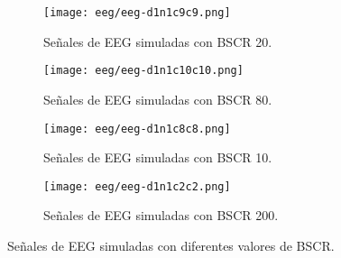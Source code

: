 
\begin{sidewaysfigure}[p]
    \centering
    \begin{subfigure}[b]{0.45\textwidth}
        \texttt{[image: eeg/eeg-d1n1c9c9.png]}
        \caption{Señales de EEG simuladas con BSCR 20.}
        \label{fig:eeg-d1n1c9c9}
        \vspace{1em}
    \end{subfigure}
    \hfill
    \begin{subfigure}[b]{0.45\textwidth}
        \texttt{[image: eeg/eeg-d1n1c10c10.png]}
        \caption{Señales de EEG simuladas con BSCR 80.}
        \label{fig:eeg-d1n1c10c10}
        \vspace{1em}
    \end{subfigure}
    \vfill
    \begin{subfigure}[b]{0.45\textwidth}
        \texttt{[image: eeg/eeg-d1n1c8c8.png]}
        \caption{Señales de EEG simuladas con BSCR 10.}
        \label{fig:eeg-d1n1c8c8}
    \end{subfigure}
    \hfill
    \begin{subfigure}[b]{0.45\textwidth}
        \texttt{[image: eeg/eeg-d1n1c2c2.png]}
        \caption{Señales de EEG simuladas con BSCR 200.}
        \label{fig:eeg-d1n1c2c2}
    \end{subfigure}
    \caption{Señales de EEG simuladas con diferentes valores de BSCR.}
    \label{fig:eeg-simulated}
\end{sidewaysfigure}